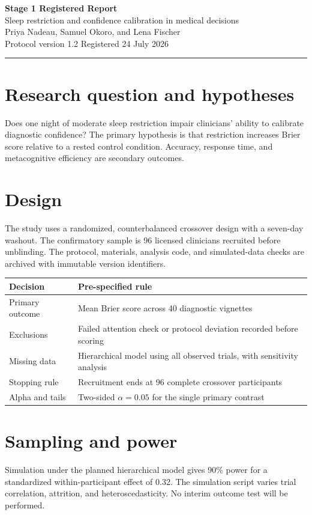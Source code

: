 \documentclass[11pt]{article}
\begin{document}
\begin{center}
{\LARGE\bfseries Stage 1 Registered Report}\\[0.25em]
{\large Sleep restriction and confidence calibration in medical decisions}\\[0.55em]
{\small Priya Nadeau, Samuel Okoro, and Lena Fischer}\\
{\small Protocol version 1.2 \quad Registered 24 July 2026}
\end{center}
\color{accent}\rule{\textwidth}{1pt}\color{black}

\section{Research question and hypotheses}
Does one night of moderate sleep restriction impair clinicians' ability to
calibrate diagnostic confidence? The primary hypothesis is that restriction
increases Brier score relative to a rested control condition. Accuracy,
response time, and metacognitive efficiency are secondary outcomes.

\section{Design}
The study uses a randomized, counterbalanced crossover design with a seven-day
washout. The confirmatory sample is 96 licensed clinicians recruited before
unblinding. The protocol, materials, analysis code, and simulated-data checks
are archived with immutable version identifiers.

\begin{tabularx}{\textwidth}{@{}lX@{}}
\toprule
\textbf{Decision} & \textbf{Pre-specified rule} \\
\midrule
Primary outcome & Mean Brier score across 40 diagnostic vignettes \\
Exclusions & Failed attention check or protocol deviation recorded before scoring \\
Missing data & Hierarchical model using all observed trials, with sensitivity analysis \\
Stopping rule & Recruitment ends at 96 complete crossover participants \\
Alpha and tails & Two-sided $\alpha=0.05$ for the single primary contrast \\
\bottomrule
\end{tabularx}

\section{Sampling and power}
Simulation under the planned hierarchical model gives 90\% power for a
standardized within-participant effect of 0.32. The simulation script varies
trial correlation, attrition, and heteroscedasticity. No interim outcome test
will be performed.
\end{document}
